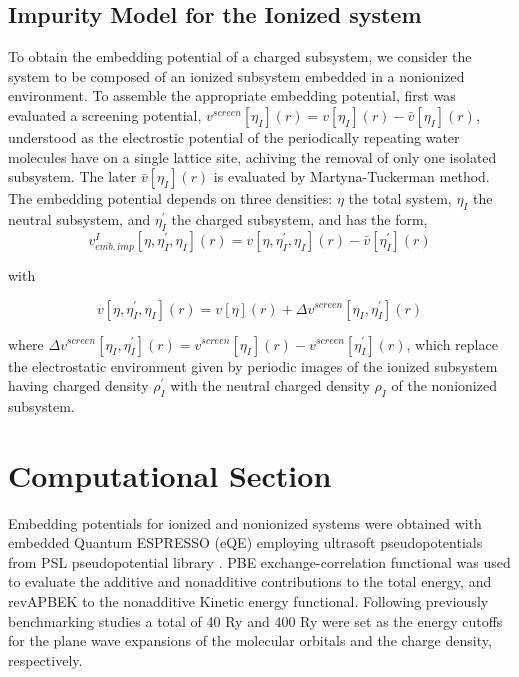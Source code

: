 \documentclass[12pt,a4paper]{article}
\begin{document}
\subsection{Impurity Model for the Ionized system}

To obtain the embedding potential of a charged subsystem, we consider the system to be composed of an ionized subsystem embedded in a nonionized
environment. To assemble the appropriate embedding potential, first was evaluated a screening potential, 
$v^{screen}[\eta_I](r) = v[\eta_I](r) - \bar{v} [\eta_I](r)$, understood as the electrostic potential of the periodically repeating water
molecules have on a single lattice site, achiving the removal of only one isolated subsystem. The later $\bar{v} [\eta_I](r)$ is evaluated by
Martyna-Tuckerman method\cite{martyna1999reciprocal}. The embedding potential depends on three densities: $\eta$ the total system,
$\eta_I$ the neutral subsystem, and $\eta^{'}_I$ the charged subsystem, and has the form, \\

\begin{equation}
	v^I_{emb,imp}[\eta, \eta^{'}_I, \eta_I](r) = v[\eta, \eta^{'}_I, \eta_I](r) - \bar{v}[\eta^{'}_I](r)
\end{equation}

with

\begin{equation}
	v[\eta, \eta^{'}_I, \eta_I](r) = v[\eta](r) + \Delta{v}^{screen}[\eta_I, \eta^{'}_I](r)
\end{equation}

where $\Delta{v}^{screen}[\eta_I, \eta^{'}_I](r) = {v}^{screen}[\eta_I](r) - {v}^{screen}[\eta^{'}_I](r)$, which replace the
electrostatic environment given by periodic images of the ionized subsystem having charged density $\rho^{'}_I$ with the neutral charged
density $\rho_I$ of the nonionized subsystem.

\section{Computational Section}

Embedding potentials for ionized and nonionized systems were obtained with embedded Quantum ESPRESSO (eQE) \cite{genova2017eqe}
employing ultrasoft pseudopotentials from PSL pseudopotential library \cite{corso2014comput}. PBE exchange-correlation functional 
\cite{perdew1996phys} was used to evaluate the additive and nonadditive contributions to the total energy, and revAPBEK
\cite{laricchia2011generalized} to the nonadditive Kinetic energy functional. Following previously benchmarking studies
\cite{genova2016avoiding, genova2017cooperation} a total of 40 Ry and 400 Ry were set as the energy cutoffs for the plane wave 
expansions of the molecular orbitals and the charge density, respectively.  \\
\end{document}

